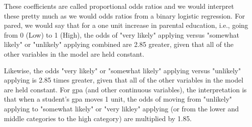 \begin{frame}
These coefficients are called proportional odds ratios and we would interpret these pretty much as we would odds ratios from a binary logistic regression. For pared, we would say that for a one unit increase in parental education, i.e., going from 0 (Low) to 1 (High), the odds of "very likely" applying versus "somewhat likely" or "unlikely" applying combined are 2.85 greater, given that all of the other variables in the model are held constant. 
\end{frame}
\begin{frame}
Likewise, the odds "very likely" or "somewhat likely" applying versus "unlikely" applying is 2.85 times greater, given that all of the other variables in the model are held constant. For gpa (and other continuous variables), the interpretation is that when a student's gpa moves 1 unit, the odds of moving from "unlikely" applying to "somewhat likely" or "very likley" applying (or from the lower and middle categories to the high category) are multiplied by 1.85.
\end{frame}

